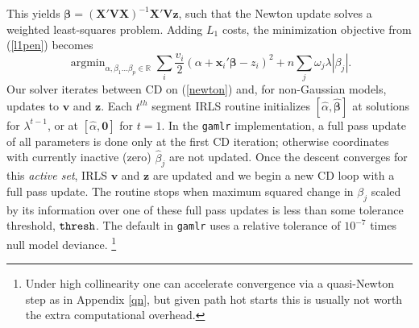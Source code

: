 \documentclass[12pt]{article}
\newcommand{\bs}[1]{\boldsymbol{#1}}
\newcommand{\mr}[1]{\mathrm{#1}}
\newcommand{\bm}[1]{\mathbf{#1}}
\newcommand{\ds}[1]{\mathds{#1}}
\DeclareMathOperator*{\argmin}{argmin}
\begin{document}
This yields $\bs{\beta} = (\bm{X}'\bm{V}\bm{X})^{-1}\bm{X}'\bm{V}\bm{z}$, such
that the Newton update solves a weighted least-squares problem.   Adding $L_1$
costs,  the minimization objective from (\ref{l1pen}) becomes
\begin{equation} \label{newton}  \argmin_{\alpha,\beta_1 \ldots \beta_p \in
\ds{R}} \sum_i \frac{v_i}{2}(\alpha + \bm{x}_i'\bs{\beta} - z_i)^2  + n\sum_j \omega_j
\lambda |\beta_j|. \end{equation} Our solver iterates between CD on
(\ref{newton}) and,  for non-Gaussian models, updates to $\bm{v}$ and
$\bm{z}$. Each $t^{th}$ segment IRLS routine initializes $[\hat \alpha,
\bs{\hat \beta}]$ at solutions for $\lambda^{t-1}$, or at $[\hat \alpha,
\bm{0}]$ for $t=1$.  In the {\tt gamlr} implementation, a full pass update of
all parameters is done only at the first CD iteration; otherwise coordinates
with currently inactive (zero) $\hat\beta_j$ are not updated. Once the descent
converges for this {\it active set}, IRLS $\bm{v}$ and $\bm{z}$ are updated
and we begin a new CD loop with a full pass update.  The routine stops when
maximum squared change in $\beta_j$ scaled by its information over one of
these full pass updates is less than some tolerance threshold, ${\tt thresh}$.
The default in {\tt gamlr} uses a relative tolerance of $10^{-7}$ times null
model deviance.  \footnote{Under high collinearity one can accelerate convergence via a
quasi-Newton step \citep[e.g.,][]{lange_numerical_2010} as in Appendix
\ref{qn}, but given path hot starts this is usually not
worth the extra computational overhead.}

\vspace{.25cm}
\end{document}
